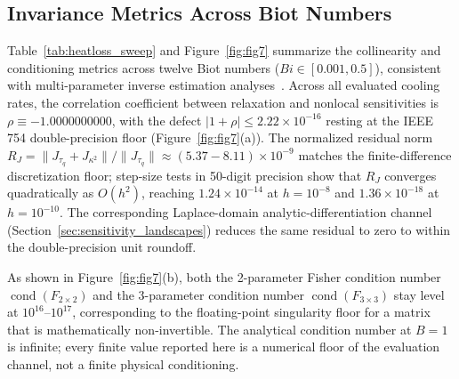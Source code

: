 \documentclass[preprint,12pt]{elsarticle}
\begin{document}
\subsection{Invariance Metrics Across Biot Numbers}

Table~\ref{tab:heatloss_sweep} and Figure~\ref{fig:fig7} summarize the collinearity and conditioning metrics across twelve Biot numbers ($Bi \in [0.001, 0.5]$), consistent with multi-parameter inverse estimation analyses~\cite{kovacs2015generalized,lapka2020development,nishi2020effect}. Across all evaluated cooling rates, the correlation coefficient between relaxation and nonlocal sensitivities is $\rho \equiv -1.0000000000$, with the defect $|1 + \rho| \le 2.22 \times 10^{-16}$ resting at the IEEE 754 double-precision floor (Figure~\ref{fig:fig7}(a)). The normalized residual norm $R_J = \|J_{\tau_q} + J_{\kappa^2}\| / \|J_{\tau_q}\| \approx (5.37 - 8.11) \times 10^{-9}$ matches the finite-difference discretization floor; step-size tests in 50-digit precision show that $R_J$ converges quadratically as $O(h^2)$, reaching $1.24 \times 10^{-14}$ at $h = 10^{-8}$ and $1.36 \times 10^{-18}$ at $h = 10^{-10}$. The corresponding Laplace-domain analytic-differentiation channel (Section~\ref{sec:sensitivity_landscapes}) reduces the same residual to zero to within the double-precision unit roundoff.

As shown in Figure~\ref{fig:fig7}(b), both the 2-parameter Fisher condition number $\operatorname{cond}(F_{2\times 2})$ and the 3-parameter condition number $\operatorname{cond}(F_{3\times 3})$ stay level at $10^{16}$--$10^{17}$, corresponding to the floating-point singularity floor for a matrix that is mathematically non-invertible. The analytical condition number at $B = 1$ is infinite; every finite value reported here is a numerical floor of the evaluation channel, not a finite physical conditioning.
\end{document}
